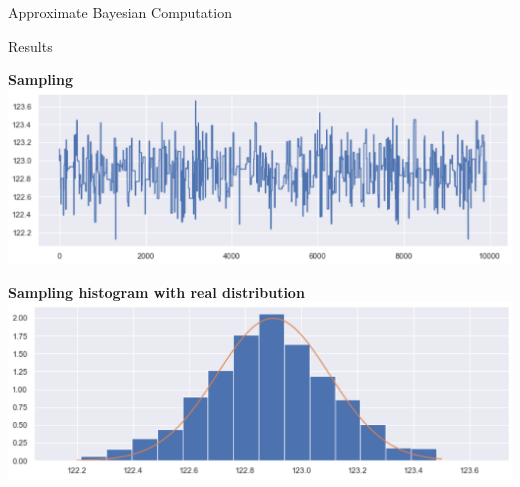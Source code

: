 \documentclass{beamer}
\begin{document}
\begin{section}{Approximate Bayesian Computation}
	
	\begin{frame}{Results}
		\begin{center}
			\begin{minipage}{0.63\textwidth}
				\begin{center}
					{\scriptsize \textbf{Sampling}}
					\includegraphics[width=\textwidth]{img/mcmc_abc_sampling}
				\end{center}
			\end{minipage}
		
			\vspace{0.2cm}
		
			\begin{minipage}{0.63\textwidth}
				\begin{center}
					{\scriptsize \textbf{Sampling histogram with real distribution}}
					\includegraphics[width=\textwidth]{img/mcmc_abc_histogram}
				\end{center}
			\end{minipage}
		\end{center}
	\end{frame}
\end{section}
\end{document}
